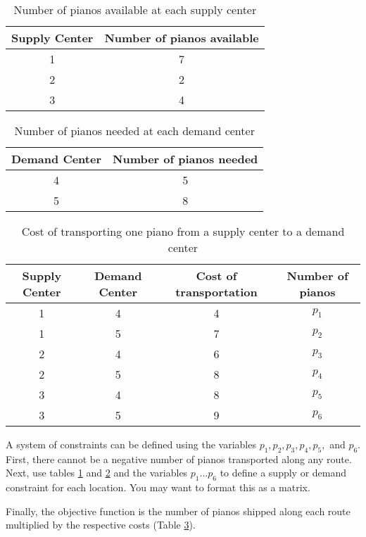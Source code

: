 \begin{table}[H]
\centering
\begin{tabular}{|c|c|}
Supply Center & Number of pianos available\\
\hline
1 & 7\\
2 & 2\\
3 & 4\\
\end{tabular}

\caption{Number of pianos available at each supply center}
\label{tab:supply}
\end{table}

\begin{table}[H]
\centering
\begin{tabular}{|c|c|}
Demand Center & Number of pianos needed\\
\hline
4 & 5\\
5 & 8\\
\end{tabular}

\caption{Number of pianos needed at each demand center}
\label{tab:demand}
\end{table}

\begin{table}[H]
\centering
\begin{tabular}{|c|c|c|c|}
Supply Center & Demand Center & Cost of transportation & Number of pianos\\
\hline
1 & 4 & 4 & $p_1$\\
1 & 5 & 7 & $p_2$\\
2 & 4 & 6 & $p_3$\\
2 & 5 & 8 & $p_4$\\
3 & 4 & 8 & $p_5$\\
3 & 5 & 9 & $p_6$\\
\end{tabular}
\caption{Cost of transporting one piano from a supply center to a demand center}
\label{tab:cost}
\end{table}

A system of constraints can be defined using the variables $p_1,p_2,p_3,p_4,p_5,$ and $p_6$.
First, there cannot be a negative number of pianos transported along any route.
Next, use tables \ref{tab:supply} and \ref{tab:demand} and the variables $p_1...p_6$ to define a supply or demand constraint for each location.
You may want to format this as a matrix.
\begin{comment} %
the following three supply constraints and two demand constraints:
\begin{align*}
p_1 + p_2  &= 7\\
p_3 + p_4  &= 2\\
p_5 + p_6  &= 4\\
p_1 + p_3 + p_5 &= 5\\
p_2 + p_4 + p_6 &= 8
\end{align*}
\end{comment}
Finally, the objective function is the number of pianos shipped along each route multiplied by the respective costs (Table \ref{tab:cost}).

